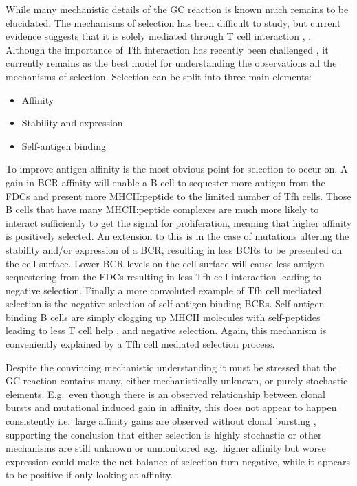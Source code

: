 While many mechanistic details of the GC reaction is known much remains to be elucidated.
The mechanisms of selection has been difficult to study, but current evidence suggests that it is solely mediated through T cell interaction \cite{victora2012germinal}, \cite{victora2014clonal}.
Although the importance of Tfh interaction has recently been challenged \cite{yeh2017limit}, it currently remains as the best model for understanding the observations all the mechanisms of selection.
Selection can be split into three main elements:
\begin{itemize}
  \item Affinity
  \item Stability and expression
  \item Self-antigen binding
\end{itemize}

To improve antigen affinity is the most obvious point for selection to occur on.
A gain in BCR affinity will enable a B cell to sequester more antigen from the FDCs and present more MHCII:peptide to the limited number of Tfh cells.
Those B cells that have many MHCII:peptide complexes are much more likely to interact sufficiently to get the signal for proliferation, meaning that higher affinity is positively selected.
An extension to this is in the case of mutations altering the stability and/or expression of a BCR, resulting in less BCRs to be presented on the cell surface.
Lower BCR levels on the cell surface will cause less antigen sequestering from the FDCs resulting in less Tfh cell interaction leading to negative selection.
Finally a more convoluted example of Tfh cell mediated selection is the negative selection of self-antigen binding BCRs.
Self-antigen binding B cells are simply clogging up MHCII molecules with self-peptides leading to less T cell help \cite{Sabouri_2014}, \cite{Bannard_Cyster_2017} and negative selection.
Again, this mechanism is conveniently explained by a Tfh cell mediated selection process.

Despite the convincing mechanistic understanding it must be stressed that the GC reaction contains many, either mechanistically unknown, or purely stochastic elements.
E.g.\ even though there is an observed relationship between clonal bursts and mutational induced gain in affinity, this does not appear to happen consistently i.e.\ large affinity gains are observed without clonal bursting \cite{tas2016visualizing}, supporting the conclusion that either selection is highly stochastic or other mechanisms are still unknown or unmonitored e.g.\ higher affinity but worse expression could make the net balance of selection turn negative, while it appears to be positive if only looking at affinity.

